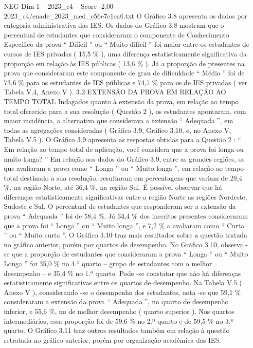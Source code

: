 \begin{textsample}{NEG Dim 1 – 2023\_c4 – Score -2.00 – 2023\_c4/enade\_2023\_med\_c56e7c1ea6.txt}
O Gráfico 3.8 apresenta os dados por categoria administrativa das IES.
Os dados do Gráfico 3.8 mostram que o percentual de estudantes que consideraram o componente de Conhecimento Específico da prova “ Difícil ” ou “ Muito difícil ” foi maior entre os estudantes de cursos de IES privadas ( 15,5 \% ), uma diferença estatisticamente significativa da proporção em relação às IES públicas ( 13,6 \% ).
Já a proporção de presentes na prova que consideraram este componente de grau de dificuldade “ Médio ” foi de 73,6 \% para os estudantes de IES públicas e 74,7 \% para os de IES privadas ( ver Tabela V.4, Anexo V ). 3.2 EXTENSÃO DA PROVA EM RELAÇÃO AO TEMPO TOTAL Indagados quanto à extensão da prova, em relação ao tempo total oferecido para a sua resolução ( Questão 2 ), os estudantes apontaram, com maior incidência, a alternativa que considerava a extensão “ Adequada ”, em todas as agregações consideradas ( Gráfico 3.9, Gráfico 3.10, e, no Anexo V, Tabela V.5 ).
O Gráfico 3.9 apresenta as respostas obtidas para a Questão 2 : “ Em relação ao tempo total de aplicação, você considera que a prova foi longa ou muito longa? ” Em relação aos dados do Gráfico 3.9, entre as grandes regiões, os que avaliaram a prova como “ Longa ” ou “ Muito longa ”, em relação ao tempo total destinado a sua resolução, resultaram em percentagens que variam de 29,4 \%, na região Norte, até 36,4 \%, na região Sul.
É possível observar que há diferenças estatisticamente significativas entre a região Norte as regiões Nordeste, Sudeste e Sul.
O percentual de estudantes que responderam ser a extensão da prova “ Adequada ” foi de 58,4 \%.
Já 34,4 \% dos inscritos presentes consideraram que a prova foi “ Longa ” ou “ Muito longa ”, e 7,2 \% a avaliaram como “ Curta ” ou “ Muito curta ”.
O Gráfico 3.10 traz mais resultados sobre a questão tratada no gráfico anterior, porém por quartos de desempenho.
No Gráfico 3.10, observa -se que a proporção de estudantes que consideraram a prova “ Longa ” ou “ Muito Longa ” foi 35,0 \% no 4.º quarto – grupo de estudantes com o melhor desempenho – e 35,4 \% no 1.º quarto.
Pode -se constatar que não há diferenças estatisticamente significativas entre os quartos de desempenho.
Na Tabela V.5 ( Anexo V ), considerando -se o desempenho dos estudantes, nota -se que 59,1 \% consideraram a extensão da prova “ Adequada ”, no quarto de desempenho inferior, e 55,6 \%, no de melhor desempenho ( quarto superior ).
Nos quartos intermediários, essa proporção foi de 59,6 \% no 2.º quarto e de 59,5 \% no 3.º quarto.
O Gráfico 3.11 traz outros resultados também em relação à questão retratada no gráfico anterior, porém por organização acadêmica das IES.

\end{textsample}
